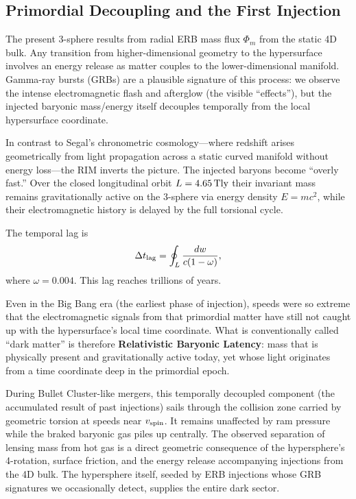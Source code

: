 \documentclass[11pt,a4paper]{article}
\begin{document}
\subsection{Primordial Decoupling and the First Injection}

The present 3-sphere results from radial ERB mass flux $\Phi_m$ from the static 4D bulk. Any transition from higher-dimensional geometry to the hypersurface involves an energy release as matter couples to the lower-dimensional manifold. Gamma-ray bursts (GRBs) are a plausible signature of this process: we observe the intense electromagnetic flash and afterglow (the visible ``effects''), but the injected baryonic mass/energy itself decouples temporally from the local hypersurface coordinate.

In contrast to Segal’s chronometric cosmology—where redshift arises geometrically from light propagation across a static curved manifold without energy loss—the RIM inverts the picture. The injected baryons become ``overly fast.'' Over the closed longitudinal orbit $L = 4.65\,\rm Tly$ their invariant mass remains gravitationally active on the 3-sphere via energy density $E = mc^2$, while their electromagnetic history is delayed by the full torsional cycle.

The temporal lag is
\[
\Delta t_{\rm lag} = \oint_L \frac{dw}{c(1-\omega)},
\]
where $\omega = 0.004$. This lag reaches trillions of years.

Even in the Big Bang era (the earliest phase of injection), speeds were so extreme that the electromagnetic signals from that primordial matter have still not caught up with the hypersurface’s local time coordinate. What is conventionally called ``dark matter'' is therefore \textbf{Relativistic Baryonic Latency}: mass that is physically present and gravitationally active today, yet whose light originates from a time coordinate deep in the primordial epoch.

During Bullet Cluster-like mergers, this temporally decoupled component (the accumulated result of past injections) sails through the collision zone carried by geometric torsion at speeds near $v_{\rm spin}$. It remains unaffected by ram pressure while the braked baryonic gas piles up centrally. The observed separation of lensing mass from hot gas is a direct geometric consequence of the hypersphere’s 4-rotation, surface friction, and the energy release accompanying injections from the 4D bulk. The hypersphere itself, seeded by ERB injections whose GRB signatures we occasionally detect, supplies the entire dark sector.
\end{document}
